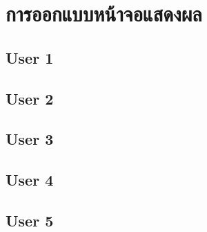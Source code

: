 \section{การออกแบบหน้าจอแสดงผล}

\subsection{User 1}

\subsection{User 2}

\subsection{User 3}

\subsection{User 4}

\subsection{User 5}

